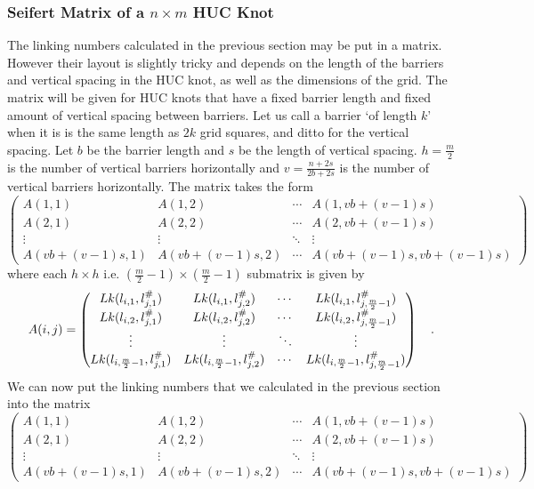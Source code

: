 \documentclass[10pt,a4paper]{report}
\theoremstyle{definition}
\theoremstyle{remark}
\theoremstyle{example}
\begin{document}
\subsubsection{Seifert Matrix of a $n\times m$ HUC Knot}
The linking numbers calculated in the previous section may be put in a matrix. However their layout is slightly tricky and depends on the length of the barriers and vertical spacing in the HUC knot, as well as the dimensions of the grid. The matrix will be given for HUC knots that have a fixed barrier length and fixed amount of vertical spacing between barriers. Let us call a barrier `of length $k$' when it is is the same length as $2k$ grid squares, and ditto for the vertical spacing. Let $b$ be the barrier length and $s$ be the length of vertical spacing. $h = \frac{m}{2}$ is the number of vertical barriers horizontally and $v = \frac{n+2s}{2b+2s}$ is the number of vertical barriers horizontally. The matrix takes the form 
\begin{equation*}
\left( \begin{array}{c|c|c|c}
A(1,1) & A(1,2) & \cdots & A(1,vb+(v-1)s) \\
\hline
A(2,1) & A(2,2) & \cdots & A(2,vb+(v-1)s) \\
\hline
\vdots & \vdots & \ddots & \vdots \\
\hline
A(vb+(v-1)s,1) & A(vb+(v-1)s,2) & \cdots & A(vb+(v-1)s,vb+(v-1)s)
\end{array} \right)
\end{equation*}
where each $h\times h$ i.e. $(\frac{m}{2}-1)\times (\frac{m}{2}-1)$ submatrix is given by 
\begin{equation*}
\def\arraystretchfactor{1.2}
A(i,j) = \begin{pmatrix}
Lk(l_{i,1},l_{j,1}^{\#}) & Lk(l_{i,1},l_{j,2}^{\#}) & \cdots & Lk(l_{i,1},l_{j,\frac{m}{2}-1}^{\#}) \\
Lk(l_{i,2},l_{j,1}^{\#}) & Lk(l_{i,2},l_{j,2}^{\#}) & \cdots & Lk(l_{i,2},l_{j,\frac{m}{2}-1}^{\#}) \\
\vdots & \vdots & \ddots & \vdots \\
Lk(l_{i,\frac{m}{2}-1},l_{j,1}^{\#}) & Lk(l_{i,\frac{m}{2}-1},l_{j,2}^{\#}) & \cdots & Lk(l_{i,\frac{m}{2}-1},l_{j,\frac{m}{2}-1}^{\#})
\end{pmatrix}
\quad.
\end{equation*}
We can now put the linking numbers that we calculated in the previous section into the matrix
\begin{equation*}
\left( \begin{array}{c|c|c|c}
A(1,1) & A(1,2) & \cdots & A(1,vb+(v-1)s) \\
\hline
A(2,1) & A(2,2) & \cdots & A(2,vb+(v-1)s) \\
\hline
\vdots & \vdots & \ddots & \vdots \\
\hline
A(vb+(v-1)s,1) & A(vb+(v-1)s,2) & \cdots & A(vb+(v-1)s,vb+(v-1)s)
\end{array} \right)
\end{equation*}
\end{document}
